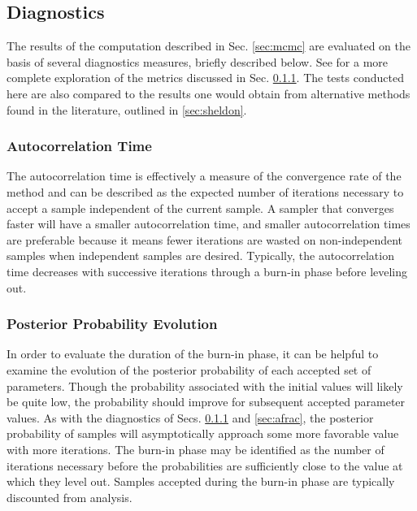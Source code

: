 \documentclass[preprint]{aastex}
\begin{document}
\begin{figure}
\caption{}
\label{fig:nullprior}
\end{figure}

\clearpage
\subsection{Diagnostics}
\label{sec:diag}

The results of the computation described in Sec. \ref{sec:mcmc} are evaluated 
on the basis of several diagnostics measures, briefly described below.  See 
\citet{for12} for a more complete exploration of the metrics discussed in Sec. 
\ref{sec:acorr}.  The tests conducted here are also compared to the results one 
would obtain from alternative methods found in the literature, outlined in 
\ref{sec:sheldon}.

\clearpage
\subsubsection{Autocorrelation Time}
\label{sec:acorr}

The autocorrelation time is effectively a measure of the convergence rate of 
the method and can be described as the expected number of iterations necessary 
to accept a sample independent of the current sample.  A sampler that converges 
faster will have a smaller autocorrelation time, and smaller autocorrelation 
times are preferable because it means fewer iterations are wasted on 
non-independent samples when independent samples are desired.  Typically, the 
autocorrelation time decreases with successive iterations through a burn-in 
phase before leveling out.

\clearpage
\subsubsection{Posterior Probability Evolution}
\label{sec:probs}

In order to evaluate the duration of the burn-in phase, it can be helpful to 
examine the evolution of the posterior probability of each accepted set of 
parameters.  Though the probability associated with the initial values will 
likely be quite low, the probability should improve for subsequent accepted 
parameter values.  As with the diagnostics of Secs. \ref{sec:acorr} and 
\ref{sec:afrac}, the posterior probability of samples will asymptotically 
approach some more favorable value with more iterations.  The burn-in phase may 
be identified as the number of iterations necessary before the probabilities 
are sufficiently close to the value at which they level out.  Samples accepted 
during the burn-in phase are typically discounted from analysis.  
\end{document}
